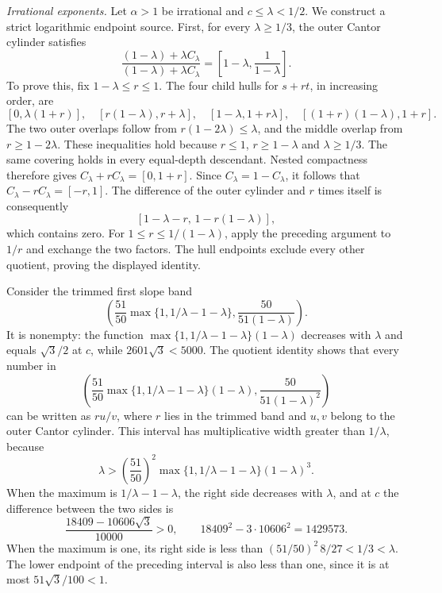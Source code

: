\par\medskip\noindent\emph{Irrational exponents.}
Let $\alpha>1$ be irrational and $c\le\lambda<1/2$. We construct a strict logarithmic endpoint source. First, for every $\lambda\ge1/3$, the outer Cantor cylinder satisfies
\[
\frac{(1-\lambda)+\lambda C_\lambda}
     {(1-\lambda)+\lambda C_\lambda}
=\left[1-\lambda,\frac1{1-\lambda}\right].
\]
To prove this, fix $1-\lambda\le r\le1$. The four child hulls for $s+rt$, in increasing order, are
\[
[0,\lambda(1+r)],\quad
[r(1-\lambda),r+\lambda],\quad
[1-\lambda,1+r\lambda],\quad
[(1+r)(1-\lambda),1+r].
\]
The two outer overlaps follow from $r(1-2\lambda)\le\lambda$, and the middle overlap from $r\ge1-2\lambda$. These inequalities hold because $r\le1$, $r\ge1-\lambda$ and $\lambda\ge1/3$. The same covering holds in every equal-depth descendant. Nested compactness therefore gives $C_\lambda+rC_\lambda=[0,1+r]$. Since $C_\lambda=1-C_\lambda$, it follows that $C_\lambda-rC_\lambda=[-r,1]$. The difference of the outer cylinder and $r$ times itself is consequently
\[
[1-\lambda-r,\,1-r(1-\lambda)],
\]
which contains zero. For $1\le r\le1/(1-\lambda)$, apply the preceding argument to $1/r$ and exchange the two factors. The hull endpoints exclude every other quotient, proving the displayed identity.

Consider the trimmed first slope band
\[
\left(
\frac{51}{50}\max\{1,1/\lambda-1-\lambda\},
\frac{50}{51(1-\lambda)}
\right).
\]
It is nonempty: the function
$\max\{1,1/\lambda-1-\lambda\}(1-\lambda)$ decreases with $\lambda$ and equals $\sqrt3/2$ at $c$, while $2601\sqrt3<5000$.
The quotient identity shows that every number in
\[
\left(
\frac{51}{50}\max\{1,1/\lambda-1-\lambda\}(1-\lambda),
\frac{50}{51(1-\lambda)^2}
\right)
\]
can be written as $ru/v$, where $r$ lies in the trimmed band and $u,v$ belong to the outer Cantor cylinder. This interval has multiplicative width greater than $1/\lambda$, because
\[
\lambda>
\left(\frac{51}{50}\right)^2
\max\{1,1/\lambda-1-\lambda\}(1-\lambda)^3.
\]
When the maximum is $1/\lambda-1-\lambda$, the right side decreases with $\lambda$, and at $c$ the difference between the two sides is
\[
\frac{18409-10606\sqrt3}{10000}>0,
\qquad 18409^2-3\cdot10606^2=1429573.
\]
When the maximum is one, its right side is less than
$(51/50)^2\,8/27<1/3<\lambda$.
The lower endpoint of the preceding interval is also less than one, since it is at most $51\sqrt3/100<1$.


